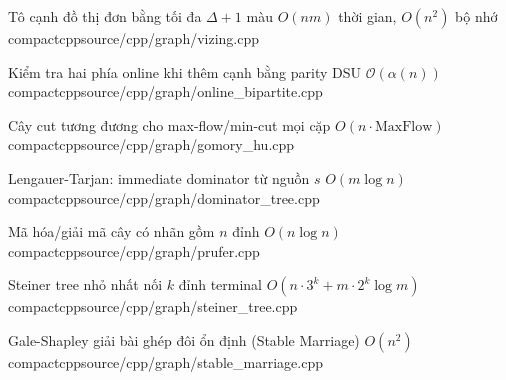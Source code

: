 {Tô cạnh đồ thị đơn bằng tối đa $\Delta+1$ màu}
{$O(nm)$ thời gian, $O(n^2)$ bộ nhớ}
{compactcpp}{source/cpp/graph/vizing.cpp}

{Kiểm tra hai phía online khi thêm cạnh bằng parity DSU}
{$\mathcal{O}(\alpha(n))$}
{compactcpp}{source/cpp/graph/online_bipartite.cpp}

{Cây cut tương đương cho max-flow/min-cut mọi cặp}
{$O(n \cdot \text{MaxFlow})$}
{compactcpp}{source/cpp/graph/gomory_hu.cpp}

{Lengauer-Tarjan: immediate dominator từ nguồn $s$}
{$O(m \log n)$}
{compactcpp}{source/cpp/graph/dominator_tree.cpp}

{Mã hóa/giải mã cây có nhãn gồm $n$ đỉnh}
{$O(n \log n)$}
{compactcpp}{source/cpp/graph/prufer.cpp}

{Steiner tree nhỏ nhất nối $k$ đỉnh terminal}
{$O(n \cdot 3^k + m \cdot 2^k \log m)$}
{compactcpp}{source/cpp/graph/steiner_tree.cpp}

{Gale-Shapley giải bài ghép đôi ổn định (Stable Marriage)}
{$O(n^2)$}
{compactcpp}{source/cpp/graph/stable_marriage.cpp}
